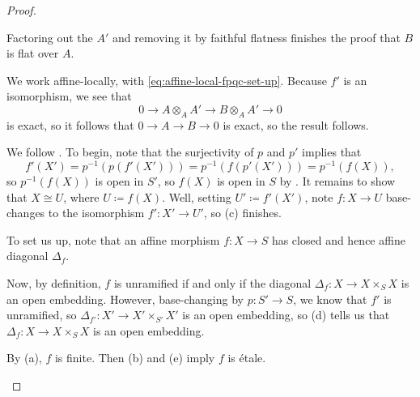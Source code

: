 \documentclass{amsart}
\begin{document}
\begin{proof}
\begin{listalph}
        Factoring out the $A'$ and removing it by faithful flatness finishes the proof that $B$ is flat over $A$.
        \item We work affine-locally, with \eqref{eq:affine-local-fpqc-set-up}. Because $f'$ is an isomorphism, we see that
        \[0\to A\otimes_AA'\to B\otimes_AA'\to0\]
        is exact, so it follows that $0\to A\to B\to0$ is exact, so the result follows.
        \item We follow \cite{emerton-descent}. To begin, note that the surjectivity of $p$ and $p'$ implies that
        \[f'(X')=p^{-1}(p(f'(X')))=p^{-1}(f(p'(X')))=p^{-1}(f(X)),\]
        so $p^{-1}(f(X))$ is open in $S'$, so $f(X)$ is open in $S$ by . It remains to show that $X\cong U$, where $U\coloneqq f(X)$. Well, setting $U'\coloneqq f'(X')$, note $f\colon X\to U$ base-changes to the isomorphism $f'\colon X'\to U'$, so (c) finishes.
        \item To set us up, note that an affine morphism $f\colon X\to S$ has closed and hence affine diagonal $\Delta_f$. %

        Now, by definition, $f$ is unramified if and only if the diagonal $\Delta_f\colon X\to X\times_SX$ is an open embedding. However, base-changing by $p\colon S'\to S$, we know that $f'$ is unramified, so $\Delta_{f'}\colon X'\to X'\times_{S'}X'$ is an open embedding, so (d) tells us that $\Delta_f\colon X\to X\times_SX$ is an open embedding.
        \item By (a), $f$ is finite. Then (b) and (e) imply $f$ is \'etale.
        \qedhere
    \end{listalph}
\end{proof}
    
\end{document}
